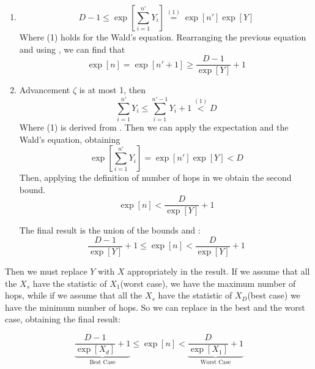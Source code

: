 \begin{enumerate}
		\item
			$$ D-1 \le \exp\left[\sum_{i=1}^{n'} Y_i\right] \stackrel{(1)}{=} \exp[n']\exp[Y] $$
			Where (1) holds for the Wald's equation. Rearranging the previous equation and using , we can find that
			\begin{equation}\label{lowerBound}
				\exp[n] = \exp[n'+1] \ge \frac{D-1}{\exp[Y]} +1
			\end{equation}
		\item
			Advancement $\zeta$ is at most 1, then
			$$\sum_{i=1}^{n'} Y_i \le \sum_{i=1}^{n'-1} Y_i +1 \stackrel{(1)}{<} D$$
			Where (1) is derived from . Then we can apply the expectation and the Wald's equation, obtaining
			$$\exp\left[\sum_{i=1}^{n'} Y_i\right] = \exp[n']\exp[Y] < D$$
			Then, applying the definition of number of hops in  we obtain the second bound.
			\begin{equation}\label{upperBound}
				\exp[n] < \frac{D}{\exp[Y]} + 1
			\end{equation}

			The final result is the union of the bounds  and :
			\begin{equation}\label{iidBounds}
				\frac{D-1}{\exp[Y]} +1 \le \exp[n] < \frac{D}{\exp[Y]} + 1
			\end{equation}
\end{enumerate}
Then we must replace $Y$ with $X$ appropriately in the result.
If we assume that all the $X_s$ have the statistic of $X_1$(worst case), we have the maximum number of hops, while if we assume that all the $X_s$ have the statistic of $X_D$(best case) we have the minimum number of hops. So we can replace in  the best and the worst case, obtaining the final result:

\begin{equation}\label{finalBounds}
	\underbrace{\frac{D-1}{\exp[X_d]} +1}_\text{Best Case} \le \exp[n] < \underbrace{\frac{D}{\exp[X_1]} + 1}_\text{Worst Case}
\end{equation}

